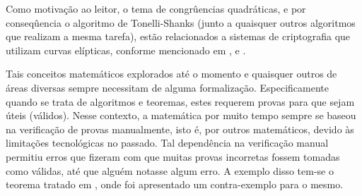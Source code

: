 Como motivação ao leitor, o tema de congrûencias quadráticas, e por conseqûencia o algoritmo de Tonelli-Shanks (junto a quaisquer outros algoritmos que realizam a mesma tarefa), estão relacionados a sistemas de criptografia que utilizam curvas elípticas, conforme mencionado em \cite{PalashSarkar2024AdvancesinMathematicsofCommunications}, \cite{kumar2021algorithm} e \cite{7133812}.




Tais conceitos matemáticos explorados até o momento e quaisquer outros de áreas diversas sempre necessitam de alguma formalização. Especificamente quando se trata de algoritmos e teoremas, estes requerem provas para que sejam úteis (válidos). Nesse contexto, a matemática por muito tempo sempre se baseou na verificação de provas manualmente, isto é, por outros matemáticos, devido às limitações tecnológicas no passado. Tal dependência na verificação manual permitiu erros que fizeram com que muitas provas incorretas fossem tomadas como válidas, até que alguém notasse algum erro.  A exemplo disso tem-se o teorema tratado em \cite{Neeman2002}, onde foi apresentado um contra-exemplo para o mesmo.

